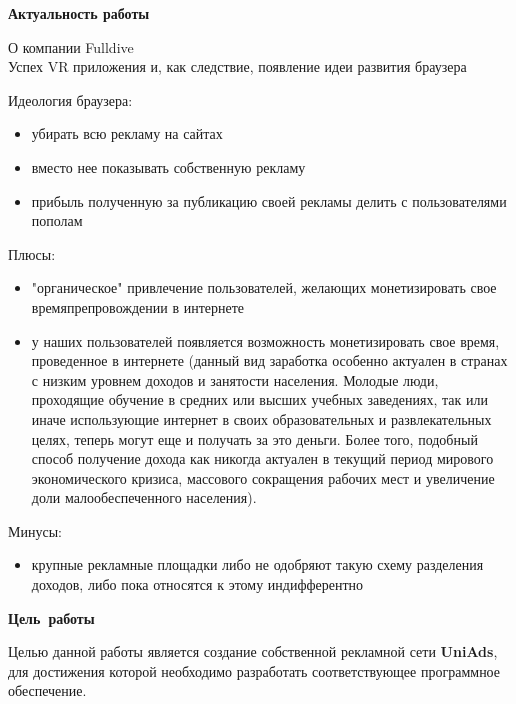 \documentclass[specification,annotation,times]{itmo-student-thesis}
\begin{document}
\tableofcontents









\startprefacepage

{\large \textbf{Актуальность работы}}
\bigbreak

{\large О компании Fulldive}
\\
Успех VR приложения и, как следствие, появление идеи развития браузера
\bigbreak

{\large Идеология браузера:}
\begin{itemize}
	\item убирать всю рекламу на сайтах
	\item вместо нее показывать собственную рекламу
	\item прибыль полученную за публикацию своей рекламы делить с пользователями пополам
\end{itemize}
\bigbreak

{\large Плюсы:}
\begin{itemize}
	\item "органическое" привлечение пользователей, желающих монетизировать свое времяпрепровождении в интернете
	\item у наших пользователей появляется возможность монетизировать свое время, проведенное в интернете (данный вид заработка особенно актуален в странах с низким уровнем доходов и занятости населения. Молодые люди, проходящие обучение в средних или высших учебных заведениях, так или иначе использующие интернет в своих образовательных и развлекательных целях, теперь могут еще и получать за это деньги. Более того, подобный способ получение дохода как никогда актуален в текущий период мирового экономического кризиса, массового сокращения рабочих мест и увеличение доли малообеспеченного населения).
\end{itemize}
\bigbreak

{\large Минусы:}
\begin{itemize}
	\item крупные рекламные площадки либо не одобряют такую схему разделения доходов, либо пока относятся к этому индифферентно
\end{itemize}
\bigbreak

\bigbreak
{\large \textbf{Цель работы}}
\bigbreak

Целью данной работы является создание собственной рекламной сети \textbf{UniAds}, для достижения которой необходимо разработать соответствующее программное обеспечение.
\bigbreak
\end{document}

